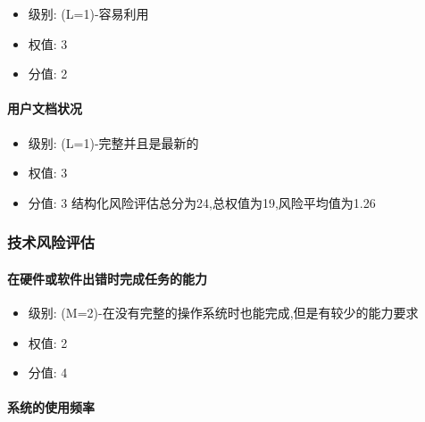 \documentclass[hyperref, a4paper]{ctexart}
\providecommand{\tightlist}{%
  \setlength{\itemsep}{0pt}\setlength{\parskip}{0pt}}
\let\oldparagraph\paragraph
\renewcommand{\paragraph}[1]{\oldparagraph{#1}\mbox{}}
\begin{document}
\begin{itemize}
\tightlist
\item
  级别: (L=1)-容易利用
\item
  权值: 3
\item
  分值: 2
\end{itemize}

\hypertarget{ux7528ux6237ux6587ux6863ux72b6ux51b5}{%
\paragraph{用户文档状况}\label{ux7528ux6237ux6587ux6863ux72b6ux51b5}}

\begin{itemize}
\tightlist
\item
  级别: (L=1)-完整并且是最新的
\item
  权值: 3
\item
  分值: 3 \newline 结构化风险评估总分为24,总权值为19,风险平均值为1.26
\end{itemize}

\hypertarget{ux6280ux672fux98ceux9669ux8bc4ux4f30}{%
\subsubsection{技术风险评估}\label{ux6280ux672fux98ceux9669ux8bc4ux4f30}}

\hypertarget{ux5728ux786cux4ef6ux6216ux8f6fux4ef6ux51faux9519ux65f6ux5b8cux6210ux4efbux52a1ux7684ux80fdux529b}{%
\paragraph{在硬件或软件出错时完成任务的能力}\label{ux5728ux786cux4ef6ux6216ux8f6fux4ef6ux51faux9519ux65f6ux5b8cux6210ux4efbux52a1ux7684ux80fdux529b}}

\begin{itemize}
\tightlist
\item
  级别: (M=2)-在没有完整的操作系统时也能完成,但是有较少的能力要求
\item
  权值: 2
\item
  分值: 4
\end{itemize}

\hypertarget{ux7cfbux7edfux7684ux4f7fux7528ux9891ux7387}{%
\paragraph{系统的使用频率}\label{ux7cfbux7edfux7684ux4f7fux7528ux9891ux7387}}
\end{document}
